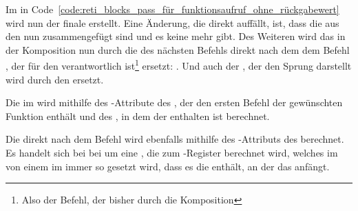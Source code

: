 Im  in Code~\ref{code:reti_blocks_pass_für_funktionsaufruf_ohne_rückgabewert} wird nun der finale  erstellt. Eine Änderung, die direkt auffällt, ist, dass die  aus den  nun zusammengefügt sind und es keine  mehr gibt. Des Weiteren wird das  in der Komposition  nun durch die  des nächsten Befehls direkt nach dem dem Befehl , der für den  verantwortlich ist\footnote{Also der Befehl, der bisher durch die Komposition } ersetzt: . Und auch der , der den Sprung  darstellt wird durch den   ersetzt.

Die   im   wird mithilfe des -Attribute des , der den ersten Befehl der gewünschten Funktion enthält und des , in dem der   enthalten ist berechnet.

Die   direkt nach dem Befehl  wird ebenfalls mithilfe des -Attributs des  berechnet. Es handelt sich bei bei  um eine , die  zum -Register berechnet wird, welches im  von einem  im  immer so gesetzt wird, dass es die  enthält, an der das  anfängt.

